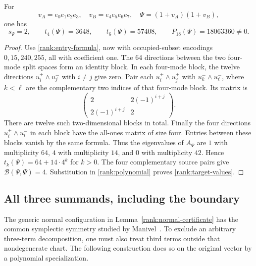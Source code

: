 \begin{lemma}\label{rank:target-certificate}
For
\[
 v_A=e_0e_1e_2e_3,\quad v_B=e_4e_5e_6e_7,\quad
 \Psi=(1+v_A)(1+v_B),
\]
one has
\begin{equation}
 s_\Psi=2,\qquad t_4(\Psi)=3648,\qquad t_6(\Psi)=57408,
 \qquad P_{18}(\Psi)=18063360\ne0.
 \label{rank:target-values}
\end{equation}
\end{lemma}
\begin{proof}
Use \eqref{rank:entry-formula}, now with occupied-subset encodings $0,15,240,255$,
all with coefficient one. The 64 directions between the two
four-mode split spaces form an identity block. In each four-mode block,
the twelve directions $u_i^+\wedge u_j^-$ with $i\ne j$ give zero.
Pair each $u_i^+\wedge u_j^+$ with $u_k^-\wedge u_\ell^-$, where $k<\ell$ are
the complementary two indices of that four-mode block. Its matrix is
\[
 \begin{pmatrix}2&2(-1)^{i+j}\\2(-1)^{i+j}&2\end{pmatrix}.
\]
There are twelve such two-dimensional blocks in total. Finally the four
directions $u_i^+\wedge u_i^-$ in each block have the all-ones matrix of
size four. Entries between these blocks vanish by the same formula.
Thus the eigenvalues of $A_\Psi$ are $1$ with multiplicity $64$, $4$ with
multiplicity $14$, and $0$ with multiplicity $42$. Hence
$t_k(\Psi)=64+14\cdot4^k$ for $k>0$. The four complementary source pairs
give $\mathcal B(\Psi,\Psi)=4$. Substitution in
\eqref{rank:polynomial} proves \eqref{rank:target-values}.
\end{proof}

\subsection{All three summands, including the boundary}

The generic normal configuration in Lemma~\ref{rank:normal-certificate}
has the common symplectic symmetry studied by
Manivel~\cite[Proposition~1]{manivel2009}. To exclude an arbitrary
three-term decomposition, one must also treat third terms outside that
nondegenerate chart. The following construction does so on the original
vector by a polynomial specialization.

